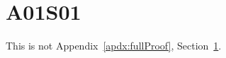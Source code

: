 \section{A01S01}\label{sec:appendix01section01}

This is not Appendix~\ref{apdx:fullProof}, Section~\ref{sec:appendix01section01}.